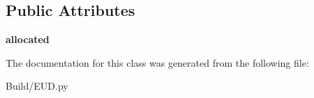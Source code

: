 \subsection*{Public Attributes}
\begin{DoxyCompactItemize}
\item 
\mbox{\label{class_e_u_d_1_1_eud_ac9aceff0e06b670cd661021e54b9d09f}} 
{\bfseries allocated}
\end{DoxyCompactItemize}


The documentation for this class was generated from the following file\+:\begin{DoxyCompactItemize}
\item 
Build/E\+U\+D.\+py\end{DoxyCompactItemize}
